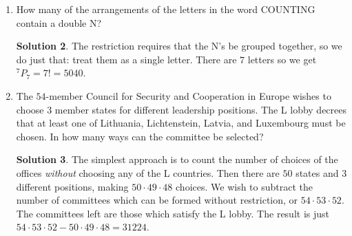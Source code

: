 \documentclass[twocolumn]{article}
\theoremstyle{definition}
\newtheorem*{solution}{Solution}
\begin{document}
\begin{enumerate}
\begin{solution}
            The list of all the palindromes would look like
            $1001, 1111, 1221, \dots, 9889, 9999$.
            Notice that if we add the first and the last, we get $11000$.
            The same holds if we add the second and the next-to-last and so on.
            Each such pair always sums to $11000$.
            So how many pairs are there?
            There are ten palindromes starting with each digit from $1$ to $9$,
            so there are $90$ palindromes.
            Hence, there are $45$ pairs and our desired sum is $45 \cdot 11000 = 495000$.
        \end{solution}
    \item How many of the arrangements of the letters in the word COUNTING contain
        a double N?
        \begin{solution}
            The restriction requires that the N's be grouped together,
            so we do just that: treat them as a single letter.
            There are $7$ letters so we get $^7P_7 = 7! = 5040$.
        \end{solution}
    \item The $54$-member Council for Security and Cooperation in Europe wishes to 
        choose $3$ member states for different leadership positions.
        The L lobby decrees that at least one of
        Lithuania, Lichtenstein, Latvia, and Luxembourg must be chosen.
        In how many ways can the committee be selected?
        \begin{solution}
            The simplest approach is to count the number of choices of the offices
            \emph{without} choosing any of the L countries.
            Then there are $50$ states and $3$ different positions,
            making $50 \cdot 49 \cdot 48$ choices.
            We wish to subtract the number of committees
            which can be formed without restriction, or $54 \cdot 53 \cdot 52$.
            The committees left are those which satisfy the L lobby.
            The result is just $54 \cdot 53 \cdot 52 - 50 \cdot 49 \cdot 48 = 31224$.
        \end{solution}
\end{enumerate}
\end{document}
